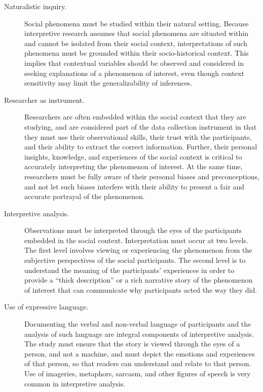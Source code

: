 \begin{description}
	\item[Naturalistic inquiry.] Social phenomena must be studied within their natural setting. Because interpretive research assumes that social phenomena are situated within and cannot be isolated from their social context, interpretations of such phenomena must be grounded within their socio-historical context. This implies that contextual variables should be observed and considered in seeking explanations of a phenomenon of interest, even though context sensitivity may limit the generalizability of inferences.

	\item[Researcher as instrument.] Researchers are often embedded within the social context that they are studying, and are considered part of the data collection instrument in that they must use their observational skills, their trust with the participants, and their ability to extract the correct information. Further, their personal insights, knowledge, and experiences of the social context is critical to accurately interpreting the phenomenon of interest. At the same time, researchers must be fully aware of their personal biases and preconceptions, and not let such biases interfere with their ability to present a fair and accurate portrayal of the phenomenon.

	\item[Interpretive analysis.] Observations must be interpreted through the eyes of the participants embedded in the social context. Interpretation must occur at two levels. The first level involves viewing or experiencing the phenomenon from the subjective perspectives of the social participants. The second level is to understand the meaning of the participants' experiences in order to provide a ``thick description'' or a rich narrative story of the phenomenon of interest that can communicate why participants acted the way they did.

	\item[Use of expressive language.] Documenting the verbal and non-verbal language of participants and the analysis of such language are integral components of interpretive analysis. The study must ensure that the story is viewed through the eyes of a person, and not a machine, and must depict the emotions and experiences of that person, so that readers can understand and relate to that person. Use of imageries, metaphors, sarcasm, and other figures of speech is very common in interpretive analysis.


\end{description}
